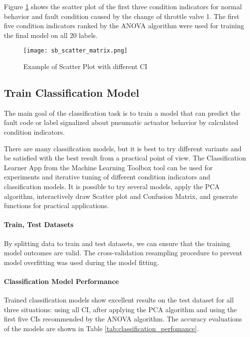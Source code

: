 Figure \ref{fig:sb_scatt_mat} shows the scatter plot of the first three condition
indicators for normal behavior and fault condition caused by the change of
throttle valve 1.
The first five condition indicators ranked by the ANOVA algorithm were used
for training the final model on all 20 labels.

\begin{figure}[h!]
    \centering
    \texttt{[image: sb\_scatter\_matrix.png]}
    \caption{Example of Scatter Plot with different CI}
    \label{fig:sb_scatt_mat}
\end{figure}


\subsection{Train Classification Model}
The main goal of the classification task is to train a model that can
predict the fault code or label signalized about pneumatic actuator
behavior by calculated condition indicators.

There are many classification models, but it is best to try different
variants and be satisfied with the best result from a practical point of
view.  The Classification Learner App from the Machine Learning Toolbox
\cite{ml}
tool can be used for experiments and iterative tuning of different
condition indicators and classification models. It is possible to try
several models, apply the PCA algorithm, interactively draw Scatter plot
and Confusion Matrix, and generate functions for practical applications.

\paragraph{Train, Test Datasets} By splitting data to train and test
datasets, we can ensure that the training model outcomes are valid. The
cross-validation resampling procedure to prevent model overfitting was used
during the model fitting.

\paragraph{Classification Model Performance}


Trained classification models show excellent results on the test dataset
for all three situations: using all CI, after applying the PCA algorithm
and using the first five CIs recommended by the ANOVA algorithm.  The
accuracy evaluations of the models are shown in Table
\ref{tab:classification_perfomance}.

